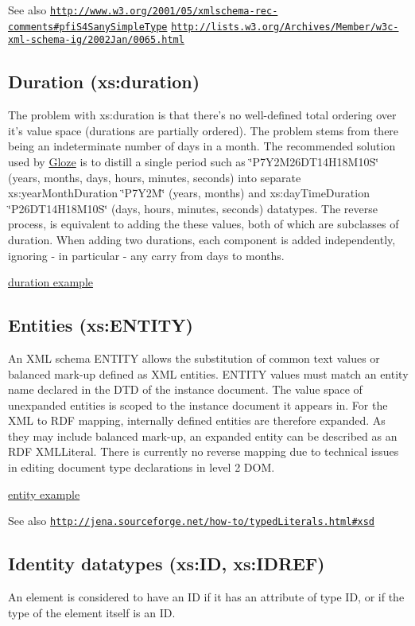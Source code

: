 \begin{DoxySeeAlso}{See also}
\href{http://www.w3.org/2001/05/xmlschema-rec-comments#pfiS4SanySimpleType}{\tt http://www.w3.org/2001/05/xmlschema-\/rec-\/comments\#pfiS4SanySimpleType} \href{http://lists.w3.org/Archives/Member/w3c-xml-schema-ig/2002Jan/0065.html}{\tt http://lists.w3.org/Archives/Member/w3c-\/xml-\/schema-\/ig/2002Jan/0065.html}
\end{DoxySeeAlso}
\hypertarget{datatypes_duration}{}\subsection{Duration (xs:duration)}\label{datatypes_duration}
The problem with xs:duration is that there's no well-\/defined total ordering over it's value space (durations are partially ordered). The problem stems from there being an indeterminate number of days in a month. The recommended solution used by \hyperlink{classcom_1_1hp_1_1gloze_1_1_gloze}{Gloze} is to distill a single period such as \char`\"{}P7Y2M26DT14H18M10S\char`\"{} (years, months, days, hours, minutes, seconds) into separate xs:yearMonthDuration \char`\"{}P7Y2M\char`\"{} (years, months) and xs:dayTimeDuration \char`\"{}P26DT14H18M10S\char`\"{} (days, hours, minutes, seconds) datatypes. The reverse process, is equivalent to adding the these values, both of which are subclasses of duration. When adding two durations, each component is added independently, ignoring -\/ in particular -\/ any carry from days to months.

\hyperlink{elementduration}{duration example}\hypertarget{datatypes_entity}{}\subsection{Entities (xs:ENTITY)}\label{datatypes_entity}
An XML schema ENTITY allows the substitution of common text values or balanced mark-\/up defined as XML entities. ENTITY values must match an entity name declared in the DTD of the instance document. The value space of unexpanded entities is scoped to the instance document it appears in. For the XML to RDF mapping, internally defined entities are therefore expanded. As they may include balanced mark-\/up, an expanded entity can be described as an RDF XMLLiteral. There is currently no reverse mapping due to technical issues in editing document type declarations in level 2 DOM.

\hyperlink{elemententity}{entity example}

\begin{DoxySeeAlso}{See also}
\href{http://jena.sourceforge.net/how-to/typedLiterals.html#xsd}{\tt http://jena.sourceforge.net/how-\/to/typedLiterals.html\#xsd}
\end{DoxySeeAlso}
\hypertarget{datatypes_xsid}{}\subsection{Identity datatypes (xs:ID, xs:IDREF)}\label{datatypes_xsid}
An element is considered to have an ID if it has an attribute of type ID, or if the type of the element itself is an ID.

